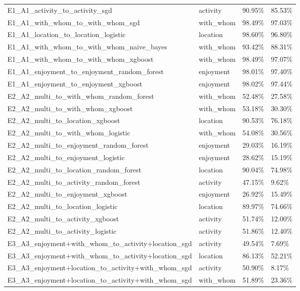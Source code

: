 \begin{tabular}{llll}
E1\_A1\_activity\_to\_activity\_sgd & activity & 90.95\% & 85.53\% \\
E1\_A1\_with\_whom\_to\_with\_whom\_sgd & with_whom & 98.49\% & 97.03\% \\
E1\_A1\_location\_to\_location\_logistic & location & 98.60\% & 96.80\% \\
E1\_A1\_with\_whom\_to\_with\_whom\_naive\_bayes & with_whom & 93.42\% & 88.31\% \\
E1\_A1\_with\_whom\_to\_with\_whom\_xgboost & with_whom & 98.49\% & 97.07\% \\
E1\_A1\_enjoyment\_to\_enjoyment\_random\_forest & enjoyment & 98.01\% & 97.40\% \\
E1\_A1\_enjoyment\_to\_enjoyment\_xgboost & enjoyment & 98.02\% & 97.44\% \\
E2\_A2\_multi\_to\_with\_whom\_random\_forest & with_whom & 52.48\% & 27.58\% \\
E2\_A2\_multi\_to\_with\_whom\_xgboost & with_whom & 53.18\% & 30.30\% \\
E2\_A2\_multi\_to\_location\_xgboost & location & 90.53\% & 76.18\% \\
E2\_A2\_multi\_to\_with\_whom\_logistic & with_whom & 54.08\% & 30.56\% \\
E2\_A2\_multi\_to\_enjoyment\_random\_forest & enjoyment & 29.03\% & 16.19\% \\
E2\_A2\_multi\_to\_enjoyment\_logistic & enjoyment & 28.62\% & 15.19\% \\
E2\_A2\_multi\_to\_location\_random\_forest & location & 90.04\% & 74.98\% \\
E2\_A2\_multi\_to\_activity\_random\_forest & activity & 47.15\% & 9.62\% \\
E2\_A2\_multi\_to\_enjoyment\_xgboost & enjoyment & 26.92\% & 15.49\% \\
E2\_A2\_multi\_to\_location\_logistic & location & 89.97\% & 74.66\% \\
E2\_A2\_multi\_to\_activity\_xgboost & activity & 51.74\% & 12.00\% \\
E2\_A2\_multi\_to\_activity\_logistic & activity & 51.86\% & 12.40\% \\
E3\_A3\_enjoyment+with\_whom\_to\_activity+location\_sgd & activity & 49.54\% & 7.69\% \\
E3\_A3\_enjoyment+with\_whom\_to\_activity+location\_sgd & location & 86.13\% & 52.21\% \\
E3\_A3\_enjoyment+location\_to\_activity+with\_whom\_sgd & activity & 50.90\% & 8.17\% \\
E3\_A3\_enjoyment+location\_to\_activity+with\_whom\_sgd & with_whom & 51.89\% & 23.36\% \\

\end{tabular}
